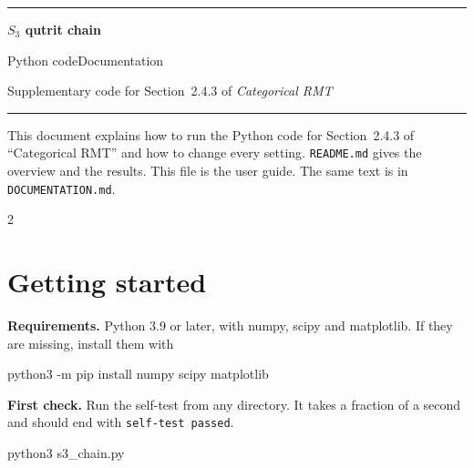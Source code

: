 \documentclass[11pt,a4paper]{article}
\date{11 November 2026}
\newcommand{\code}[1]{\texttt{\textcolor{codeink}{#1}}}
\newcommand{\lead}[1]{\textbf{#1}\enspace}
\begin{document}
\thispagestyle{plain}

\begin{center}
  {\color{accent}\rule{\linewidth}{1.2pt}}\par\vspace{1.4ex}
  {\Huge\bfseries $S_3$ qutrit chain}\par\vspace{1.0ex}
  {\Large Python code\enspace\textperiodcentered\enspace Documentation}\par\vspace{1.4ex}
  {\normalsize Supplementary code for Section~2.4.3 of \textit{Categorical RMT}}\par\vspace{0.5ex}
  {\small\color{tabgray}\thedate}\par\vspace{1.0ex}
  {\color{accent}\rule{\linewidth}{1.2pt}}
\end{center}

This document explains how to run the Python code for Section~2.4.3 of ``Categorical RMT'' and how to change
every setting. \code{README.md} gives the overview and the results. This file is the user guide. The same
text is in \code{DOCUMENTATION.md}.

\begin{multicols}{2}\raggedcolumns
\makeatletter{}\makeatother
\end{multicols}

\section{Getting started}\label{sec:start}

\lead{Requirements.} Python 3.9 or later, with numpy, scipy and matplotlib. If they are missing, install them with
\begin{shell}
python3 -m pip install numpy scipy matplotlib
\end{shell}

\lead{First check.} Run the self-test from any directory. It takes a fraction of a second and should end with
\code{self-test passed}.
\begin{shell}
python3 s3_chain.py
\end{shell}
\end{document}
